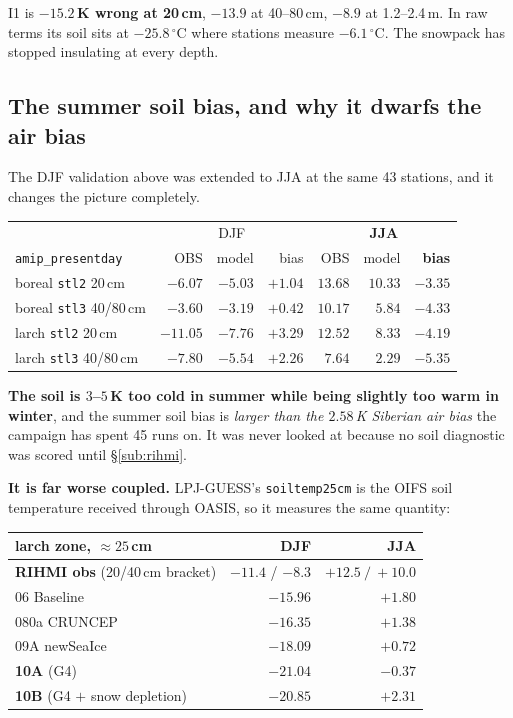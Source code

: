 \documentclass[10pt]{article}
\begin{document}
\noindent I1 is \textbf{$-15.2$\,K wrong at 20\,cm}, $-13.9$ at 40--80\,cm, $-8.9$ at
1.2--2.4\,m. In raw terms its soil sits at $-25.8\,^\circ$C where stations measure
$-6.1\,^\circ$C. The snowpack has stopped insulating at every depth.

\subsection{The summer soil bias, and why it dwarfs the air bias}\label{sub:summersoil}
The DJF validation above was extended to JJA at the same 43 stations, and it changes the
picture completely.

\begin{center}\footnotesize
\begin{tabular}{l r r r r r r}
\toprule
 & \multicolumn{3}{c}{DJF} & \multicolumn{3}{c}{\textbf{JJA}} \\
\texttt{amip\_presentday} & OBS & model & bias & OBS & model & \textbf{bias} \\
\midrule
boreal \texttt{stl2} 20\,cm & $-6.07$ & $-5.03$ & $+1.04$ & $13.68$ & $10.33$ & $\mathbf{-3.35}$ \\
boreal \texttt{stl3} 40/80\,cm & $-3.60$ & $-3.19$ & $+0.42$ & $10.17$ & $5.84$ & $\mathbf{-4.33}$ \\
larch \texttt{stl2} 20\,cm & $-11.05$ & $-7.76$ & $+3.29$ & $12.52$ & $8.33$ & $\mathbf{-4.19}$ \\
larch \texttt{stl3} 40/80\,cm & $-7.80$ & $-5.54$ & $+2.26$ & $7.64$ & $2.29$ & $\mathbf{-5.35}$ \\
\bottomrule
\end{tabular}
\end{center}

\noindent \textbf{The soil is $3$--$5$\,K too cold in summer while being slightly too warm in
winter}, and the summer soil bias is \emph{larger than the $2.58$\,K Siberian air bias} the
campaign has spent 45 runs on. It was never looked at because no soil diagnostic was scored
until \S\ref{sub:rihmi}.

\textbf{It is far worse coupled.} LPJ-GUESS's \texttt{soiltemp25cm} is the OIFS soil
temperature received through OASIS, so it measures the same quantity:

\begin{center}\footnotesize
\begin{tabular}{l r r}
\toprule
larch zone, ${\approx}25$\,cm & DJF & \textbf{JJA} \\
\midrule
\textbf{RIHMI obs} (20/40\,cm bracket) & $-11.4$ / $-8.3$ & $\mathbf{+12.5\ /\ +10.0}$ \\
06 Baseline & $-15.96$ & $+1.80$ \\
080a CRUNCEP & $-16.35$ & $+1.38$ \\
09A newSeaIce & $-18.09$ & $+0.72$ \\
\textbf{10A} (G4) & $-21.04$ & $\mathbf{-0.37}$ \\
\textbf{10B} (G4 $+$ snow depletion) & $-20.85$ & $\mathbf{+2.31}$ \\
\bottomrule
\end{tabular}
\end{center}
\end{document}
